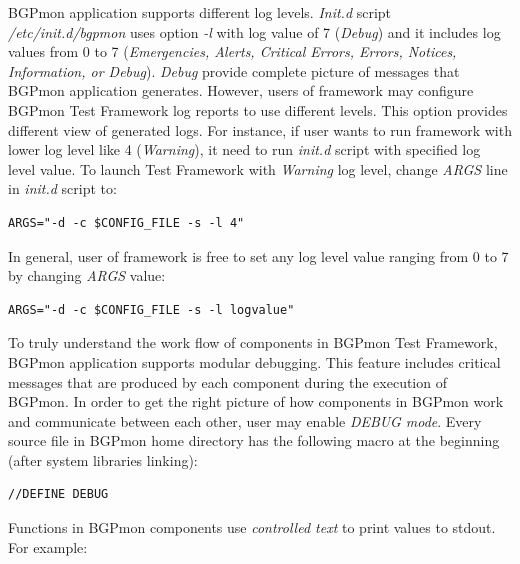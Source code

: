 BGPmon application  supports different log levels.  \emph{Init.d} script  \emph{/etc/init.d/bgpmon} uses option \emph{-l} with  log value of 7 (\emph{Debug}) and it includes  log values from 0 to 7 (\emph{Emergencies, Alerts, Critical Errors, Errors, Notices, Information, or Debug}). \emph{Debug} provide complete picture of messages that BGPmon application generates. However,  users of framework may configure BGPmon Test Framework log reports to use different levels. This option provides different view of generated logs. For instance, if user  wants to run framework with lower log level like 4 (\emph{Warning}), it need to run \emph{init.d} script with specified log level value. To launch Test Framework with \emph{Warning} log level, change \emph{ARGS} line in \emph{init.d} script to:
\begin{verbatim}
ARGS="-d -c $CONFIG_FILE -s -l 4"
\end{verbatim}

In general, user of framework is free to set any log level value ranging from 0 to 7 by changing \emph{ARGS} value:
\begin{verbatim}
ARGS="-d -c $CONFIG_FILE -s -l logvalue"
\end{verbatim}


To truly understand the work flow of components in BGPmon Test Framework, BGPmon application supports modular debugging.  This feature includes critical  messages that are produced by each component during the execution of BGPmon. In order to get the right picture of how components in BGPmon work and communicate between each other, user may enable \emph{DEBUG mode}.  Every source file  in BGPmon home directory has the following macro at the beginning  (after  system libraries linking): 
\begin{verbatim}
//DEFINE DEBUG
\end{verbatim}

Functions in BGPmon components use \emph{controlled text} to print values to stdout. For example:

